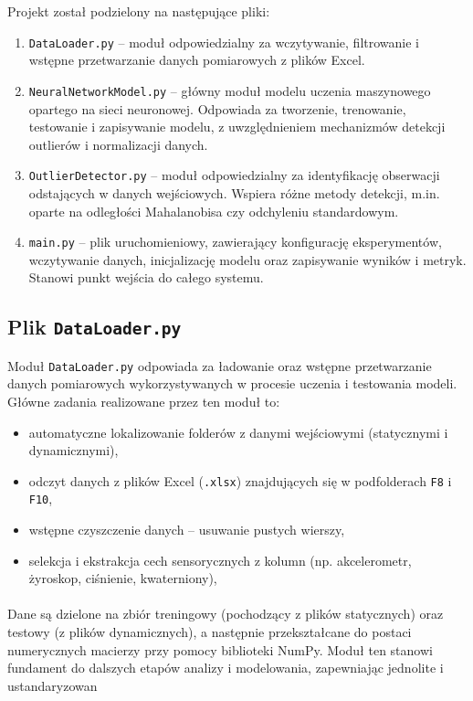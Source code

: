 \documentclass{classrep}
\begin{document}
Projekt został podzielony na następujące pliki:

\begin{enumerate}
	\item \texttt{DataLoader.py} – moduł odpowiedzialny za wczytywanie, filtrowanie i wstępne przetwarzanie danych pomiarowych z plików Excel.

	\item \texttt{NeuralNetworkModel.py} – główny moduł modelu uczenia maszynowego opartego na sieci neuronowej. Odpowiada za tworzenie, trenowanie, testowanie i zapisywanie modelu, z uwzględnieniem mechanizmów detekcji outlierów i normalizacji danych.

	\item \texttt{OutlierDetector.py} – moduł odpowiedzialny za identyfikację obserwacji odstających w danych wejściowych. Wspiera różne metody detekcji, m.in. oparte na odległości Mahalanobisa czy odchyleniu standardowym.

	\item \texttt{main.py} – plik uruchomieniowy, zawierający konfigurację eksperymentów, wczytywanie danych, inicjalizację modelu oraz zapisywanie wyników i metryk. Stanowi punkt wejścia do całego systemu.

\end{enumerate}

\clearpage{}
\subsection{Plik \texttt{DataLoader.py}}

Moduł \texttt{DataLoader.py} odpowiada za ładowanie oraz wstępne przetwarzanie danych pomiarowych wykorzystywanych w procesie uczenia i testowania modeli.
Główne zadania realizowane przez ten moduł to:
\begin{itemize}
	\item automatyczne lokalizowanie folderów z danymi wejściowymi (statycznymi i dynamicznymi),
	\item odczyt danych z plików Excel (\texttt{.xlsx}) znajdujących się w podfolderach \texttt{F8} i \texttt{F10},
	\item wstępne czyszczenie danych – usuwanie pustych wierszy,
	\item selekcja i ekstrakcja cech sensorycznych z kolumn (np. akcelerometr, żyroskop, ciśnienie, kwaterniony),
\end{itemize}
\paragraph{}
Dane są dzielone na zbiór treningowy (pochodzący z plików statycznych) oraz testowy (z plików dynamicznych), a następnie przekształcane do postaci numerycznych macierzy przy pomocy biblioteki NumPy.
Moduł ten stanowi fundament do dalszych etapów analizy i modelowania, zapewniając jednolite i ustandaryzowan
\end{document}
